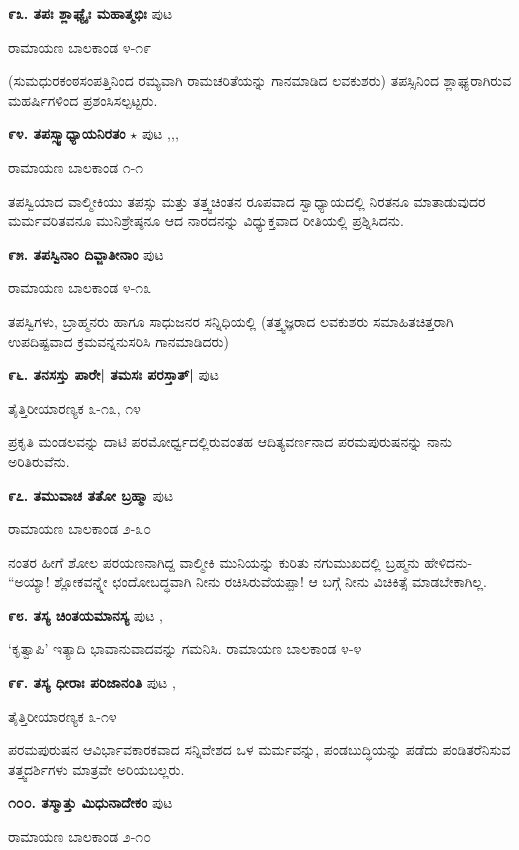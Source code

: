 \medskip
\noindent\textbf{೯೩. ತಪಃ ಶ್ಲಾಘ್ಯೈಃ ಮಹಾತ್ಮಭಿಃ} \hfill ಪುಟ \pageref{211}

\hfill ರಾಮಾಯಣ ಬಾಲಕಾಂಡ ೪-೧೯

(ಸುಮಧುರಕಂಠಸಂಪತ್ತಿನಿಂದ ರಮ್ಯವಾಗಿ ರಾಮಚರಿತೆಯನ್ನು ಗಾನಮಾಡಿದ ಲವಕುಶರು) ತಪಸ್ಸಿನಿಂದ ಶ್ಲಾಘ್ಯರಾಗಿರುವ ಮಹರ್ಷಿಗಳಿಂದ ಪ್ರಶಂಸಿಸಲ್ಪಟ್ಟರು. 

\medskip
\noindent\textbf{೯೪. ತಪಸ್ಸ್ವಾಧ್ಯಾಯನಿರತಂ} $\star$ \hfill ಪುಟ \pageref{153},\pageref{162},\pageref{194},\pageref{232e}

\hfill ರಾಮಾಯಣ ಬಾಲಕಾಂಡ ೧-೧

ತಪಸ್ವಿಯಾದ ವಾಲ್ಮೀಕಿಯು ತಪಸ್ಸು ಮತ್ತು ತತ್ತ್ವಚಿಂತನ ರೂಪವಾದ ಸ್ವಾಧ್ಯಾಯದಲ್ಲಿ ನಿರತನೂ ಮಾತಾಡುವುದರ ಮರ್ಮವರಿತವನೂ ಮುನಿಶ್ರೇಷ್ಠನೂ ಆದ ನಾರದನನ್ನು ವಿಧ್ಯುಕ್ತವಾದ ರೀತಿಯಲ್ಲಿ ಪ್ರಶ್ನಿಸಿದನು.

\medskip
\noindent\textbf{೯೫. ತಪಸ್ವಿನಾಂ ದಿವ್ಜಾತೀನಾಂ } \hfill ಪುಟ \pageref{211}

\hfill ರಾಮಾಯಣ ಬಾಲಕಾಂಡ ೪-೧೩

ತಪಸ್ವಿಗಳು, ಬ್ರಾಹ್ಮನರು ಹಾಗೂ ಸಾಧುಜನರ ಸನ್ನಿಧಿಯಲ್ಲಿ (ತತ್ತ್ವಜ್ಞರಾದ ಲವಕುಶರು ಸಮಾಹಿತಚಿತ್ತರಾಗಿ ಉಪದಿಷ್ಟವಾದ ಕ್ರಮವನ್ನನುಸರಿಸಿ ಗಾನಮಾಡಿದರು)

\medskip
\noindent\textbf{೯೬. ತನಸಸ್ತು ಪಾರೇ| ತಮಸಃ ಪರಸ್ತಾತ್|} \hfill ಪುಟ \pageref{251}

\hfill ತೈತ್ತಿರೀಯಾರಣ್ಯಕ ೩-೧೩, ೧೪

ಪ್ರಕೃತಿ ಮಂಡಲವನ್ನು ದಾಟಿ ಪರಮೋರ್ಧ್ವದಲ್ಲಿರುವಂತಹ ಆದಿತ್ಯವರ್ಣನಾದ ಪರಮಪುರುಷನನ್ನು ನಾನು ಅರಿತಿರುವೆನು.

\medskip
\noindent\textbf{೯೭. ತಮುವಾಚ ತತೋ ಬ್ರಹ್ಮಾ} \hfill ಪುಟ \pageref{203d}

\hfill ರಾಮಾಯಣ ಬಾಲಕಾಂಡ ೨-೩೦

ನಂತರ ಹೀಗೆ ಶೋಲ ಪರಯಣನಾಗಿದ್ದ ವಾಲ್ಮೀಕಿ ಮುನಿಯನ್ನು ಕುರಿತು ನಗುಮುಖದಲ್ಲಿ ಬ್ರಹ್ಮನು ಹೇಳಿದನು- ``ಅಯ್ಯಾ! ಶ್ಲೋಕವನ್ನ್ನೇ ಛಂದೋಬದ್ಧವಾಗಿ ನೀನು ರಚಿಸಿರುವೆಯಪ್ಪಾ! ಆ ಬಗ್ಗೆ ನೀನು ವಿಚಿಕಿತ್ಸೆ ಮಾಡಬೇಕಾಗಿಲ್ಲ. 

\medskip
\noindent\textbf{೯೮. ತಸ್ಯ  ಚಿಂತಯಮಾನಸ್ಯ} \hfill ಪುಟ \pageref{238c},\pageref{240}

`ಕೃತ್ವಾಪಿ' ಇತ್ಯಾದಿ ಭಾವಾನುವಾದವನ್ನು ಗಮನಿಸಿ. \hfill ರಾಮಾಯಣ ಬಾಲಕಾಂಡ ೪-೪

\medskip
\noindent\textbf{೯೯. ತಸ್ಯ ಧೀರಾಃ ಪರಿಜಾನಂತಿ} \hfill ಪುಟ \pageref{150},\pageref{251}

\hfill ತೈತ್ತಿರೀಯಾರಣ್ಯಕ ೩-೧೪

ಪರಮಪುರುಷನ ಆವಿರ್ಭಾವಕಾರಕವಾದ ಸನ್ನಿವೇಶದ ಒಳ ಮರ್ಮವನ್ನು, ಪಂಡಬುದ್ಧಿಯನ್ನು ಪಡೆದು ಪಂಡಿತರೆನಿಸುವ ತತ್ತ್ವದರ್ಶಿಗಳು ಮಾತ್ರವೇ ಅರಿಯಬಲ್ಲರು.

\medskip
\noindent\textbf{೧೦೦. ತಸ್ಮಾತ್ತು ಮಿಧುನಾದೇಕಂ} \hfill ಪುಟ \pageref{198d}

\hfill ರಾಮಾಯಣ ಬಾಲಕಾಂಡ ೨-೧೦

